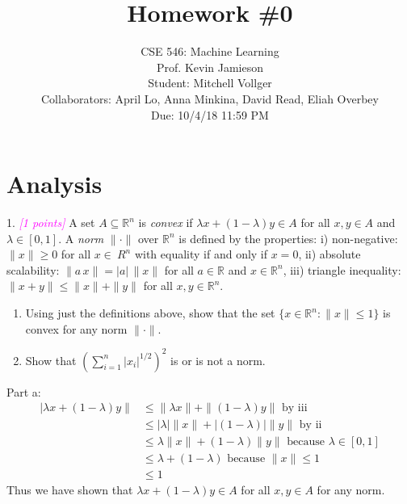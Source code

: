 \documentclass{article}
\date{{}}
\newcommand{\field}[1]{\mathbb{#1}}
\newcommand{\1}{\mathbf{1}}
\newcommand{\R}{\field{R}} %
\newcommand{\grade}[1]{\small\textcolor{magenta}{\emph{[#1 points]}} \normalsize}
\begin{document}
\title{Homework \#0}
\author{\normalsize{CSE 546: Machine Learning}\\
\normalsize{Prof. Kevin Jamieson} \\
\normalsize{Student: Mitchell Vollger} \\
\normalsize{Collaborators: April Lo, Anna Minkina, David Read, Eliah Overbey} \\
\normalsize{Due: 10/4/18  11:59 PM}}
\maketitle


\section{Analysis}
{\color{blue}
1. \grade{1} A set $A \subseteq \R^n$ is \emph{convex} if $\lambda x + (1-\lambda) y \in A$ for all $x,y\in A$ and $\lambda \in [0,1]$.
A \emph{norm} $\|\cdot\|$ over $\R^n$ is defined by the properties:
i) non-negative: $\|x\|\geq 0$ for all $x \in \  R^n$ with equality if and only if $x=0$,
ii) absolute scalability: $\|a \, x\| = |a| \, \|x\|$ for all $a \in \R$ and $x \in \R^n$, iii) triangle inequality: $\|x+y\| \leq \|x\| + \|y\|$ for all $x,y \in \R^n$.
\begin{enumerate}
	\item Using just the definitions above, show that the set $\{ x \in \R^n : \|x\| \leq 1\}$ is convex for any norm $\| \cdot \|$.
	\item Show that $\left(\sum_{i=1}^n |x_i|^{1/2}\right)^2$ is or is not a norm.
\end{enumerate} 
}

Part a:
	\begin{align}
	   	| \lambda x + (1-\lambda) y \| & \le \|\lambda x\| + \|(1-\lambda)y\| \text{ by iii}\\
	    & \le  |\lambda| \| x\| + |(1-\lambda)| \|y\| \text{ by ii}\\
	    & \le  \lambda \| x\| + (1-\lambda) \|y\| \text{ because $\lambda \in [0,1]$}\\
    	& \le  \lambda + (1-\lambda) \text{ because $\|x\| \le 1$}\\
        & \le 1 
	\end{align}
    Thus we have shown that $\lambda x + (1-\lambda) y \in A$ for all $x,y \in A$ for any norm.\\
	
\end{document}
